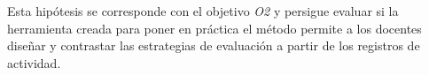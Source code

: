 Esta hipótesis se corresponde con el objetivo \emph{O2} y persigue evaluar si la herramienta creada para poner en práctica el método permite a los docentes diseñar y contrastar las estrategias de evaluación a partir de los registros de actividad.









